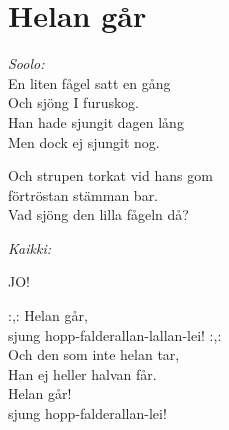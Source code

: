 \section{Helan går}

\textit{Soolo:}\\
En liten fågel satt en gång\\
Och sjöng I furuskog.\\
Han hade sjungit dagen lång\\
Men dock ej sjungit nog.

Och strupen torkat vid hans gom\\
förtröstan stämman bar.\\
Vad sjöng den lilla fågeln då?

\textit{Kaikki:}

JO!

:,: Helan går,\\
sjung hopp-falderallan-lallan-lei! :,:\\
Och den som inte helan tar,\\
Han ej heller halvan får.\\
Helan går!\\
sjung hopp-falderallan-lei!